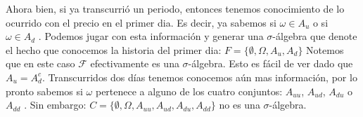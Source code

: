 \documentclass[14pt]{extreport}
\begin{document}
	Ahora bien, si ya transcurrió un periodo, entonces tenemos conocimiento de lo ocurrido con el precio en el primer dia. Es decir, ya sabemos si $\omega \in A_u$ o si $\omega \in A_d$ . Podemos jugar con esta información y generar una $\sigma$-álgebra que denote el hecho que conocemos la historia del primer dia: $F = \{\emptyset, \Omega, A_u , A_d \}$ Notemos que en este caso $\mathcal{F}$ efectivamente es una $\sigma$-álgebra. Esto es fácil de ver dado que $A_u = A^c_d$. Transcurridos dos días tenemos conocemos aún mas información, por lo pronto sabemos si $\omega$ pertenece a alguno de los cuatro conjuntos: $A_{uu}$, $A_{ud}$, $A_{du}$ o $A_{dd}$ . Sin embargo: $C = \{\emptyset, \Omega, A_{uu}, A_{ud}, A_{du}, A_{dd} \}$ no es una $\sigma$-álgebra.
\end{document}
